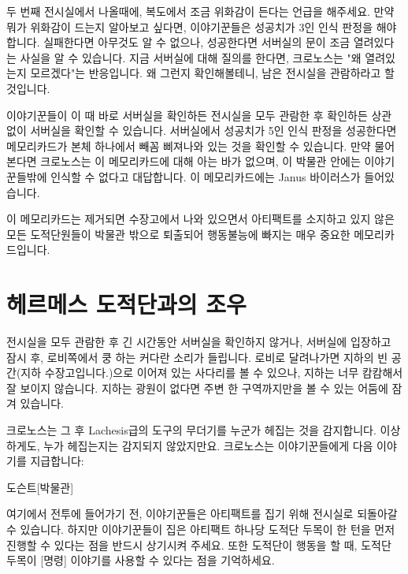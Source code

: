 \documentclass{report}
\begin{document}
	두 번째 전시실에서 나올때에, 복도에서 조금 위화감이 든다는 언급을 해주세요. 만약 뭐가 위화감이 드는지 알아보고 싶다면, 이야기꾼들은 성공치가 3인 인식 판정을 해야합니다. 실패한다면 아무것도 알 수 없으나, 성공한다면 서버실의 문이 조금 열려있다는 사실을 알 수 있습니다. 지금 서버실에 대해 질의를 한다면, 크로노스는 "왜 열려있는지 모르겠다"는 반응입니다. 왜 그런지 확인해볼테니, 남은 전시실을 관람하라고 할 것입니다.
	
	이야기꾼들이 이 때 바로 서버실을 확인하든 전시실을 모두 관람한 후 확인하든 상관 없이 서버실을 확인할 수 있습니다. 서버실에서 성공치가 5인 인식 판정을 성공한다면 메모리카드가 본체 하나에서 빼꼼 삐져나와 있는 것을 확인할 수 있습니다. 만약 물어본다면 크로노스는 이 메모리카드에 대해 아는 바가 없으며, 이 박물관 안에는 이야기꾼들밖에 인식할 수 없다고 대답합니다. 이 메모리카드에는 Janus 바이러스가 들어있습니다.
	
	이 메모리카드는 제거되면 수장고에서 나와 있으면서 아티팩트를 소지하고 있지 않은 모든 도적단원들이 박물관 밖으로 퇴출되어 행동불능에 빠지는 매우 중요한 메모리카드입니다.
	
	\section*{헤르메스 도적단과의 조우}
	전시실을 모두 관람한 후 긴 시간동안 서버실을 확인하지 않거나, 서버실에 입장하고 잠시 후, 로비쪽에서 쿵 하는 커다란 소리가 들립니다. 로비로 달려나가면 지하의 빈 공간(지하 수장고입니다.)으로 이어져 있는 사다리를 볼 수 있으나, 지하는 너무 캄캄해서 잘 보이지 않습니다. 지하는 광원이 없다면 주변 한 구역까지만을 볼 수 있는 어둠에 잠겨 있습니다.
	
	크로노스는 그 후 Lachesis급의 도구의 무더기를 누군가 헤집는 것을 감지합니다. 이상하게도, 누가 헤집는지는 감지되지 않았지만요. 크로노스는 이야기꾼들에게 다음 이야기를 지급합니다:
	\begin{spoiler}{도슨트}{[박물관]}
		
		
	\end{spoiler}
	여기에서 전투에 들어가기 전, 이야기꾼들은 아티팩트를 집기 위해 전시실로 되돌아갈 수 있습니다. 하지만 이야기꾼들이 집은 아티팩트 하나당 도적단 두목이 한 턴을 먼저 진행할 수 있다는 점을 반드시 상기시켜 주세요. 또한 도적단이 행동을 할 때, 도적단 두목이 [명령] 이야기를 사용할 수 있다는 점을 기억하세요.
	
\end{document}

